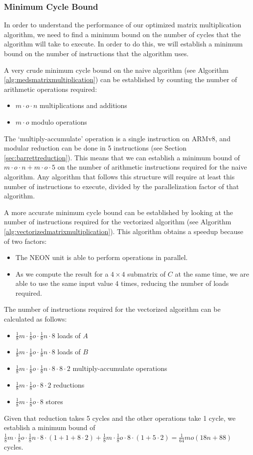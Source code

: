 \documentclass[11pt,a4paper]{report}
\theoremstyle{definition}
\begin{document}
\subsubsection{Minimum Cycle Bound}
In order to understand the performance of our optimized matrix multiplication algorithm, we need to find a minimum bound on the number of cycles that the algorithm will take to execute. In order to do this, we will establish a minimum bound on the number of instructions that the algorithm uses.

A very crude minimum cycle bound on the naive algorithm (see Algorithm \ref{alg:medsmatrixmultiplication}) can be established by counting the number of arithmetic operations required:
\begin{itemize}
  \item $m \cdot o \cdot n$ multiplications and additions
  \item $m \cdot o$ modulo operations
\end{itemize}
The `multiply-accumulate' operation is a single instruction on ARMv8, and modular reduction can be done in 5 instructions (see Section \ref{sec:barrettreduction}). This means that we can establish a minimum bound of $m \cdot o \cdot n + m \cdot o \cdot 5$ on the number of arithmetic instructions required for the naive algorithm. Any algorithm that follows this structure will require at least this number of instructions to execute, divided by the parallelization factor of that algorithm.

A more accurate minimum cycle bound can be established by looking at the number of instructions required for the vectorized algorithm (see Algorithm \ref{alg:vectorizedmatrixmultiplication}). This algorithm obtains a speedup because of two factors:
\begin{itemize}
  \item The NEON unit is able to perform operations in parallel.
  \item As we compute the result for a $4\times4$ submatrix of $C$ at the same time, we are able to use the same input value 4 times, reducing the number of loads required.
\end{itemize}
The number of instructions required for the vectorized algorithm can be calculated as follows:
\begin{itemize}
  \item $\frac{1}{8}m \cdot \frac{1}{8}o \cdot \frac{1}{8}n \cdot 8$ loads of $A$
  \item $\frac{1}{8}m \cdot \frac{1}{8}o \cdot \frac{1}{8}n \cdot 8$ loads of $B$
  \item $\frac{1}{8}m \cdot \frac{1}{8}o \cdot \frac{1}{8}n \cdot 8 \cdot 8 \cdot 2$ multiply-accumulate operations
  \item $\frac{1}{8}m \cdot \frac{1}{8}o \cdot 8 \cdot 2$ reductions
  \item $\frac{1}{8}m \cdot \frac{1}{8}o \cdot 8$ stores
\end{itemize}
Given that reduction takes 5 cycles and the other operations take 1 cycle, we establish a minimum bound of $\frac{1}{8}m \cdot \frac{1}{8}o \cdot \frac{1}{8}n \cdot 8 \cdot (1 + 1 + 8 \cdot 2) + \frac{1}{8}m \cdot \frac{1}{8}o \cdot 8 \cdot (1 + 5 \cdot 2) = \frac{1}{64}mo(18n + 88)$ cycles.
\end{document}
